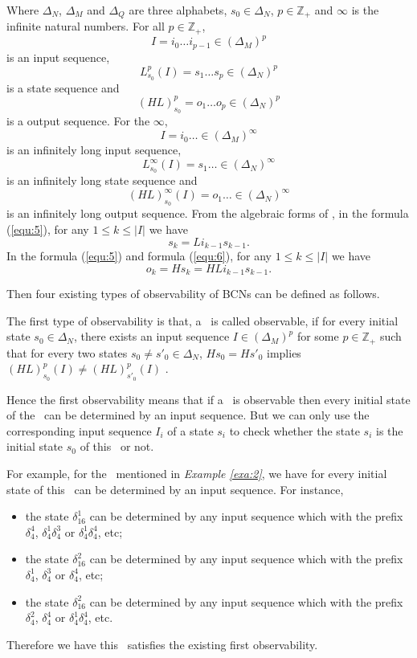 Where $\Delta_N$, $\Delta_M$ and $\Delta_Q$ are three alphabets, $s_0\in \Delta_N$, $p\in \mathbb{Z}_+$ and $\infty$ is the infinite natural numbers. For all  $p\in \mathbb{Z}_+$, \[I=i_0 \ldots i_{p-1} \in(\Delta_M)^p\] is an input sequence, \[L^p_{s_0}(I)=s_1 \ldots s_{p} \in(\Delta_N)^p\] is a state sequence and \[(HL)^p_{s_0}=o_1 \ldots o_{p} \in(\Delta_N)^p\] is a output sequence. For the $\infty$, \[I=i_0 \ldots  \in(\Delta_M)^{\infty}\] is an infinitely long input sequence, \[L^{\infty}_{s_0}(I)=s_1 \ldots  \in(\Delta_N)^{\infty}\] is an infinitely long state sequence and \[(HL)^{\infty}_{s_0}(I)=o_1 \ldots \in(\Delta_N)^{\infty}\] is an infinitely long output sequence. From the algebraic forms of \BCNs, in the formula (\ref{equ:5}), for any $1\le k \le |I|$ we have \[s_k=Li_{k-1}s_{k-1}.\] In the formula (\ref{equ:5}) and formula (\ref{equ:6}), for any $1\le k \le |I|$ we have  \[o_k=Hs_k=HLi_{k-1}s_{k-1}.\] 

Then four existing types of observability of BCNs can be defined as follows.
\begin{definition}
The first type of observability is that, a \BCN\ is called observable, if for every initial state $s_0 \in \Delta_N$, there exists an input sequence $I\in(\Delta_M)^p$ for some $p\in \mathbb{Z}_+$ such that for every two states $s_0\neq {s'}_0\in \Delta_N$, $Hs_0=H{s'}_0$ implies $(HL)^p_{s_0}(I)\neq (HL)^p_{{s'}_0}(I)$ \cite{cheng2009controllability}.
\end{definition}

Hence the first observability means that if a \BCN\ is observable then every initial state of the \BCN\ can be determined by an input sequence. But we can only use the corresponding input sequence $I_i$ of a state $s_i$ to check whether the state $s_i$ is the initial state $s_0$ of this \BCN\ or not.
\begin{example}
For example, for the \BCN\ mentioned in {\em Example \ref{exa:2}}, we have for every initial state of this \BCN\ can be determined by an input sequence.  For instance,
\begin{itemize}
  \item the state $\delta_{16}^1$ can be determined by any input sequence which with the prefix $\delta_{4}^4$, $\delta_{4}^1 \delta_{4}^3$ or $\delta_{4}^1 \delta_{4}^4$, etc;
  \item the state $\delta_{16}^2$ can be determined by any input sequence which with the prefix $\delta_{4}^1$, $\delta_{4}^3$ or $\delta_{4}^4$, etc;
  \item the state $\delta_{16}^2$ can be determined by any input sequence which with the prefix $\delta_{4}^2$, $\delta_{4}^4$ or $\delta_{4}^1 \delta_{4}^4$, etc.
\end{itemize} 

Therefore we have this \BCN\ satisfies the existing first observability.
\end{example}   

